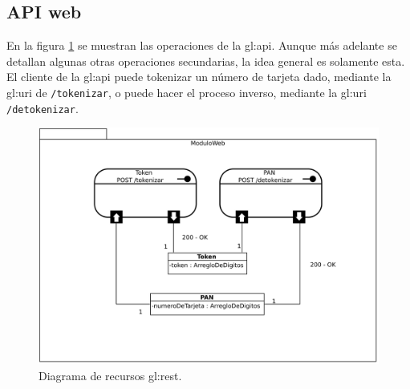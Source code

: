 %
%

\subsection{API web}

En la figura \ref{diagrama_api} se muestran las operaciones de la \gls{gl:api}.
Aunque más adelante se detallan algunas otras operaciones secundarias, la idea
general es solamente esta. El cliente de la \gls{gl:api} puede tokenizar un
número de tarjeta dado, mediante la \gls{gl:uri} de \texttt{/tokenizar}, o puede
hacer el proceso inverso, mediante la \gls{gl:uri} \texttt{/detokenizar}.

\begin{figure}
  \begin{center}
    \includegraphics[width=0.8\linewidth]{diagramas/api_rest.png}
    \caption{Diagrama de recursos \gls{gl:rest}.}
    \label{diagrama_api}
  \end{center}
\end{figure}
